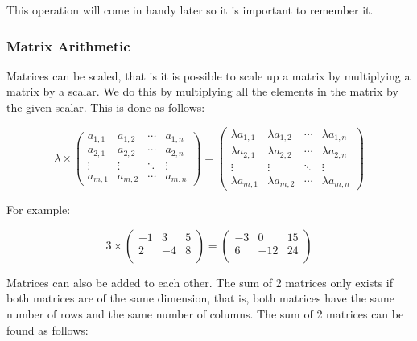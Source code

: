 \documentclass[a4paper,oneside]{report}
\begin{document}
This operation will come in handy later so it is important to remember it.

\subsubsection{Matrix Arithmetic}

Matrices can be scaled, that is it is possible to scale up a matrix by
multiplying a matrix by a scalar. We do this by multiplying all the elements
in the matrix by the given scalar. This is done as follows:

\[ \lambda \times \begin{pmatrix}
	a_{1,1} & a_{1,2} & \cdots & a_{1,n} \\
	a_{2,1} & a_{2,2} & \cdots & a_{2,n} \\
	\vdots  & \vdots  & \ddots & \vdots  \\
	a_{m,1} & a_{m,2} & \cdots & a_{m,n}
\end{pmatrix} = \begin{pmatrix}
	\lambda a_{1,1} & \lambda a_{1,2} & \cdots & \lambda a_{1,n} \\
	\lambda a_{2,1} & \lambda a_{2,2} & \cdots & \lambda a_{2,n} \\
	\vdots  & \vdots  & \ddots & \vdots  \\
	\lambda a_{m,1} & \lambda a_{m,2} & \cdots & \lambda a_{m,n}
\end{pmatrix} \]

For example:

\[ 3 \times \begin{pmatrix}
	-1 & 3 & 5 \\
	2 & -4 & 8 \\
\end{pmatrix} = \begin{pmatrix}
	-3 & 0 & 15 \\
	6 & -12 & 24 \\
\end{pmatrix} \]

Matrices can also be added to each other. The sum of 2 matrices only exists
if both matrices are of the same dimension, that is, both matrices have the
same number of rows and the same number of columns. The sum of 2 matrices can
be found as follows:
\end{document}
